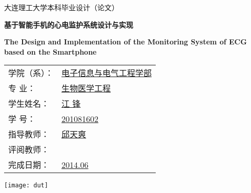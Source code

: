\thispagestyle{cover}

\vspace{80pt}

\begin{center}
     \songti%
    大连理工大学本科毕业设计（论文）
\end{center}

\vskip 40pt

\begin{center}
     \bfseries\songti%
    基于智能手机的心电监护系统设计与实现
\end{center}

\begin{center}
     \bfseries\songti%
    The Design and Implementation of the Monitoring System of ECG based on the Smartphone
\end{center}

\vskip 180pt

\begin{center}
    \begin{tabularx}{.6\textwidth}{>{\fangsong}l >{\fangsong}X<{\centering}}
        学院（系）： & \uline{\hfill 电子信息与电气工程学部 \hfill} \\
        专{\quad} {\quad}业：   & \uline{\hfill 生物医学工程 \hfill} \\
        学生姓名：   &  \uline{\hfill 江{\quad} 锋 \hfill} \\
        学{\quad} {\quad}号：   &  \uline{\hfill 201081602 \hfill} \\
        指导教师：   &  \uline{\hfill 邱天爽 \hfill} \\
        评阅教师：   &  \uline{\hfill  \hfill} \\
        完成日期：   &  \uline{\hfill 2014.06 \hfill} \\
    \end{tabularx}
\end{center}

\vskip 40pt

\begin{center}
    \texttt{[image: dut]}
\end{center}
